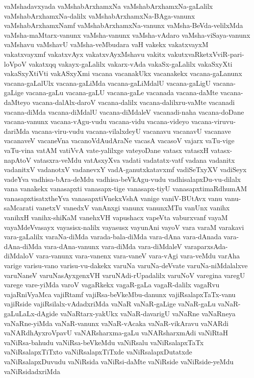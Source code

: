 {vaMshadavxyada
vaMshabArxhamxNa
vaMshabArxhamxNa-gaLalilx
vaMshabArxhamxNa-dalilx
vaMshabArxhamxNa-BAga-vanunx
vaMshabArxhamxNamf
vaMshabArxhamxNa-vanunx
vaMsha-BeVda-velilxMda
vaMsha-maMtarx-vanunx
vaMsha-vanunx
vaMsha-vAdaro
vaMsha-viSaya-vanunx
vaMshavu
vaMshavU
vaMsha-veMbudara
vaH
vakekx
vakatxvayxM
vakatxvayxmf
vakatxvAyx
vakatxvAyxMshavu
vakitx
vakutxvaRketxVviR-pari-loVpoV
vakatxqq
vakayx-gaLalilx
vakarx-vAda
vakaSx-gaLalilx
vakaSxyXti
vakaSxyXtiVti
vakASxyXmi
vacana
vacanakUkx
vacanakekx
vacana-gaLanunx
vacana-gaLalUlx
vacana-gaLiMda
vacana-gaLiMdalU
vacana-gaLigU
vacana-gaLige
vacana-gaLu
vacana-gaLU
vacana-gaLe
vacanada
vacana-daMte
vacana-daMteyo
vacana-dalAlx-daroV
vacana-dalilx
vacana-dalilxru-vaMte
vacanadi
vacana-diMda
vacana-diMdalU
vacana-diMdaleV
vacanadi-naha
vacana-doDane
vacana-vanunx
vacana-vAgu-vudu
vacana-vidu
vacana-videyo
vacana-viruvu-dariMda
vacana-viru-vudu
vacana-vilalxdeyU
vacanavu
vacanavU
vacanave
vacanaveV
vacaneVna
vacanoVdAudAraNe
vacasA
vacasoV
vajarx
vaTu-vige
vaTu-vina
vatAM
vatiVvA
vate-yalilxge
vateyoDane
vatasx
vatasxH
vatasx-napAtoV
vatasxra-veMdu
vatAsxyXva
vadati
vadatatx-vatf
vadana
vadanitx
vadanitxV
vadanotxV
vadanevxY
vadA-ganutxkatavxmf
vadiSeTxyXV
vadiSeyx
vadeYva
vadhisa-bAra-deMdu
vadhisa-beVkAgu-vudu
vadhisalapxDu-vu-dilalx
vana
vanakekx
vanasapxti
vanasapx-tige
vanasapx-tiyU
vanasapxtimaRdhumAM
vanasapxtisatxtheYva
vanasapxtiVnekxVshA
vanige
vaniV-BUtAvx
vanu
vanu-saMcarati
vanetxV
vanedxV
vanAnxgi
vanunx
vanunxMTu
vanUnx
vanihx
vanihxH
vanihx-shiKaM
vanehxVH
vapushacx
vapeVta
vaburxvanf
vayaM
vayaMdeVvasayx
vayasisx-nalilx
vayasusx
vayunAni
vayoV
vara
varaM
varakavi
vara-gaLalilx
varaNa-diMda
varada-bala-diMda
vara-dAna
vara-dAnada
vara-dAna-diMda
vara-dAna-vanunx
vara-diMda
vara-diMdaleV
varaparxsAda-diMdaloV
vara-vanunx
vara-vanenx
vara-vaneV
vara-vAgi
vara-veMdu
varAha
varige
varisu-vano
varisu-vu-dakekx
varuNa
varuNa-deVvate
varuNa-niMdalalxve
varuNaneV
varuNasAyxgenxVH
varuNAdi-rUpadalilx
varuNoV
varegina
varegU
varege
vare-yiMda
varoV
vagaRkekx
vagaR-gaLa
vagaR-dalilx
vagaRvu
vajaRniVyaMca
vajiRtamf
vajiRsa-beVkeMbu-danunx
vajiRsalapxTaTx-vanu
vajiRside
vajiRsilalx-vAdadxriMda
vaNaR
vaNaR-gaLige
vaNaR-gaLu
vaNaR-gaLuLaLx-dAgide
vaNaRtarx-yakUkx
vaNaR-davarigU
vaNaRne
vaNaRneya
vaNaRne-yiMda
vaNaR-vanunx
vaNaR-vAcaka
vaNaR-vikAravu
vaNARdi
vaNARdhAyxroVpavU
vaNARsharxma-gaLu
vaNARsharxmAdi
vaNiRtaH
vaNiRsa-bahudu
vaNiRsa-beVkeMdu
vaNiRsalu
vaNiRsalapxTaTx
vaNiRsalapxTiTxto
vaNiRsalapxTiTxde
vaNiRsalapxDutatxde
vaNiRsalapxDuvudu
vaNiRsida
vaNiRsi-daMte
vaNiRside
vaNiRside-yeMdu
vaNiRsidadxriMda
}
